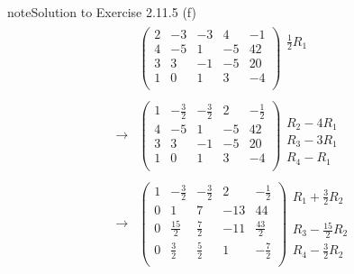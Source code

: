 \documentclass[letterpaper,10pt,english]{jupyterBook}
\begin{document}
\begin{sphinxadmonition}{note}{Solution to Exercise 2.11.5}
\sphinxAtStartPar
(f)
\begin{equation*}
\begin{split} \begin{align*} 
    & \left( \begin{array}{cccc|c} 
         2 & -3 & -3 & 4 & -1 \\ 
         4 & -5 & 1 & -5 & 42 \\ 
         3 & 3 & -1 & -5 & 20 \\ 
         1 & 0 & 1 & 3 & -4 \\ 
    \end{array} \right) 
    \begin{array}{l} \frac{1}{2} R_{1}\\ \phantom{x} \\ \phantom{x} \\ \phantom{x} \end{array} \\ \\ 
    \longrightarrow 
    & \left( \begin{array}{cccc|c} 
         1 & - \frac{3}{2} & - \frac{3}{2} & 2 & - \frac{1}{2} \\ 
         4 & -5 & 1 & -5 & 42 \\ 
         3 & 3 & -1 & -5 & 20 \\ 
         1 & 0 & 1 & 3 & -4 \\ 
    \end{array} \right) 
    \begin{array}{l} \phantom{x} \\ R_{2} - 4 R_{1} \\ R_{3} - 3 R_{1} \\ R_{4} - R_{1} \end{array} \\ \\ 
    \longrightarrow 
    & \left( \begin{array}{cccc|c} 
         1 & - \frac{3}{2} & - \frac{3}{2} & 2 & - \frac{1}{2} \\ 
         0 & 1 & 7 & -13 & 44 \\ 
         0 & \frac{15}{2} & \frac{7}{2} & -11 & \frac{43}{2} \\ 
         0 & \frac{3}{2} & \frac{5}{2} & 1 & - \frac{7}{2} \\ 
    \end{array} \right) 
    \begin{array}{l} R_{1} + \frac{3}{2} R_{2}\\ \phantom{x} \\ R_{3} - \frac{15}{2} R_{2} \\ R_{4} - \frac{3}{2} R_{2} \end{array} \\ \\ 

\end{align*}
\end{split}
\end{equation*}
\end{sphinxadmonition}
\end{document}
